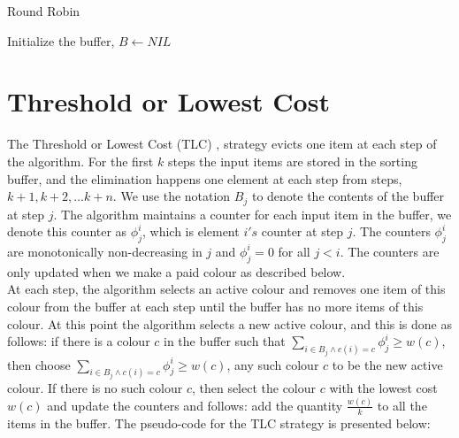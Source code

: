 \begin{algorithm}
\caption{Round Robin}
\label{roundrobin}
Initialize the buffer, $B \gets NIL$ \;
\end{algorithm}

\section{Threshold or Lowest Cost} \label{tlc}
The Threshold or Lowest Cost (TLC) \cite{avigdor2013improved}, strategy evicts
one item at each step of the algorithm. For the first $k$ steps the input items are 
stored in the sorting
buffer, and the elimination happens one element at each step from steps, $k +
1, k + 2, \ldots k + n$. We use the notation $B_j$ to denote the contents of the
buffer at step $j$. The algorithm maintains a counter for each input item in the
buffer, we denote this counter as $\phi_j^i$, which is element $i's$ counter
at step $j$. The counters $\phi_j^i$ are monotonically non-decreasing in $j$ and
$\phi_j^i = 0$ for all $j < i$. The counters are only updated when we make a
paid colour as described below. \\

At each step, the algorithm selects an active colour and removes one item of
this colour from the buffer at each step until the buffer has no more items of
this colour. At this point the algorithm selects a new active colour, and this
is done as follows: if there is a colour $c$ in the buffer such that $\sum_{i
\in B_j \wedge c(i) = c} \phi_j^i \geq w(c)$, then choose $\sum_{i
\in B_j \wedge c(i) = c} \phi_j^i \geq w(c)$, any such colour $c$ to
be the new active colour. If there is no such colour $c$, then select the colour
$c$ with the lowest cost $w(c)$ and update the counters and follows: add the
quantity $\frac{w(c)}{k}$ to all the items in the buffer. The pseudo-code for
the TLC strategy is presented below:  


